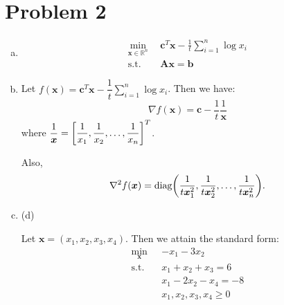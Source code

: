 \documentclass{article}
\def\RR{\mathbb{R}}
\def\bb{\boldsymbol{b}}
\def\bc{\boldsymbol{c}}
\def\bx{\boldsymbol{x}}
\def\bA{\boldsymbol{A}}
\begin{document}
\newpage
\section*{Problem 2}
\begin{enumerate}[(a)]
    \item
        \[
            \begin{aligned}
				\min_{\bx\in\RR^n}\ \ &
				\bc^T\bx
				-\frac{1}{t}\sum_{i=1}^n\log{x_i}
				\\
				\mbox{s.t.}\ \ &
				\bA\bx=\bb
            \end{aligned}
        \]
    \item
		Let $f(\bx)=\bc^T\bx-\dfrac{1}{t}\sum_{i=1}^n\log{x_i}$. Then we have:
		\[
		    \nabla f(\bx)=\bc-\frac{1}{t}\frac{1}{\bx}
		\]
		where $\dfrac{1}{\bx}=\mqty[\dfrac{1}{x_1},\dfrac{1}{x_2},\dots,\dfrac{1}{x_n}]^T$.

		Also,
		\[
			\nabla^2f(\bx)=\mbox{diag}\qty(\frac{1}{t\bx_1^2},\frac{1}{t\bx_2^2},\dots,\frac{1}{t\bx_n^2})
		.\]
	\item(d)

		Let $\bx=(x_1,x_2,x_3,x_4)$. Then we attain the standard form:
		\[
		    \begin{aligned}
				\min_{\bx}\ \ \ &
				-x_1-3x_2
				\\
				\mbox{s.t.}\ \ \ 
				&
				x_1+x_2+x_3=6
				\\
				&
				x_1-2x_2-x_4=-8
				\\
				&x_1,x_2,x_3,x_4\ge0
		    \end{aligned}
		\]


\end{enumerate}
\end{document}
